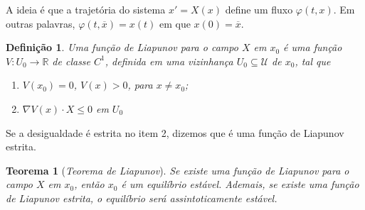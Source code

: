 \documentclass[
	12pt,				%
	openright,			%
	twoside,			%
	a4paper,			%
	english,			%
	french,				%
	spanish,			%
	brazil				%
	]{abntex2}
\newtheorem{teorema}{Teorema}[chapter]
\newtheorem{definicao}{Definição}[chapter]
\newcommand{\R}{\mathbb{R}}
\newcommand{\xbarra}{\overline{x}}
\newcommand{\U}{\mathcal{U}}
\newcommand{\Fi}{\varphi}
\begin{document}
A ideia é que a trajetória do sistema $x' = X(x)$ define um fluxo $\Fi(t, x)$.
Em outras palavras, $\Fi(t, \xbarra) = x(t)$ em que $x(0) = \xbarra$.

\begin{definicao} \label{funcliapunov}
	Uma função de Liapunov para o campo $X$ em $x_0$ é uma função
	$V: U_0 \to \R$ de classe $C^1$, definida em uma vizinhança $U_0 \subseteq \U$ de $x_0$, tal que
 		\begin{enumerate}
			\item $V(x_0) = 0$, $V(x) > 0$, para $x \neq x_0$;
			\item $\nabla V(x) \cdot X \leq 0$ em $U_0$
		\end{enumerate}
\end{definicao}

Se a desigualdade é estrita no item 2, dizemos que é uma função de Liapunov estrita.

\begin{teorema}[\textit{Teorema de Liapunov}] \label{teorliapunov}
	Se existe uma função de Liapunov para o campo $X$ em $x_0$, então $x_0$ é um
	equilíbrio estável. Ademais, se existe uma função de Liapunov estrita, o equilíbrio
	será assintoticamente estável.
\end{teorema}
\end{document}

